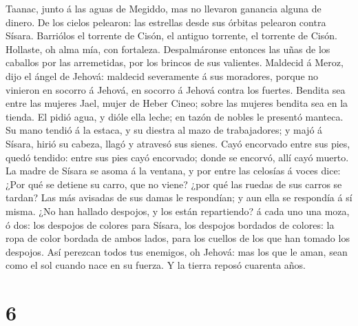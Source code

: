 Taanac, junto á las aguas de Megiddo, mas no llevaron ganancia alguna de
dinero.  De los cielos pelearon: las estrellas desde sus
órbitas pelearon contra Sísara.  Barriólos el torrente de
Cisón, el antiguo torrente, el torrente de Cisón. Hollaste, oh alma mía,
con fortaleza.  Despalmáronse entonces las uñas de los
caballos por las arremetidas, por los brincos de sus valientes.
 Maldecid á Meroz, dijo el ángel de Jehová: maldecid
severamente á sus moradores, porque no vinieron en socorro á Jehová, en
socorro á Jehová contra los fuertes.  Bendita sea entre
las mujeres Jael, mujer de Heber Cineo; sobre las mujeres bendita sea en
la tienda.  El pidió agua, y dióle ella leche; en tazón
de nobles le presentó manteca.  Su mano tendió á la
estaca, y su diestra al mazo de trabajadores; y majó á Sísara, hirió su
cabeza, llagó y atravesó sus sienes.  Cayó encorvado
entre sus pies, quedó tendido: entre sus pies cayó encorvado; donde se
encorvó, allí cayó muerto.  La madre de Sísara se asoma á
la ventana, y por entre las celosías á voces dice: ¿Por qué se detiene
su carro, que no viene? ¿por qué las ruedas de sus carros se tardan?
 Las más avisadas de sus damas le respondían; y aun ella
se respondía á sí misma.  ¿No han hallado despojos, y los
están repartiendo? á cada uno una moza, ó dos: los despojos de colores
para Sísara, los despojos bordados de colores: la ropa de color bordada
de ambos lados, para los cuellos de los que han tomado los despojos.
 Así perezcan todos tus enemigos, oh Jehová: mas los que
le aman, sean como el sol cuando nace en su fuerza. Y la tierra reposó
cuarenta años.

\hypertarget{section-5}{%
\section{6}\label{section-5}}


